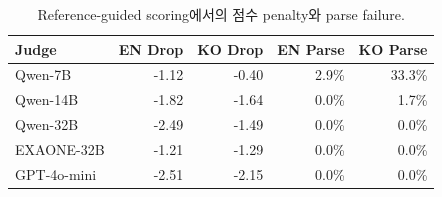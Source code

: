 \begin{table}[t]
\centering
\caption{Reference-guided scoring에서의 점수 penalty와 parse failure.}
\label{tab:reference-score-change}
\small
\begin{tabular}{lrrrr}
\toprule
Judge & EN Drop & KO Drop & EN Parse & KO Parse \\
\midrule
Qwen-7B & -1.12 & -0.40 & 2.9\% & 33.3\% \\
Qwen-14B & -1.82 & -1.64 & 0.0\% & 1.7\% \\
Qwen-32B & -2.49 & -1.49 & 0.0\% & 0.0\% \\
EXAONE-32B & -1.21 & -1.29 & 0.0\% & 0.0\% \\
GPT-4o-mini & -2.51 & -2.15 & 0.0\% & 0.0\% \\
\bottomrule
\end{tabular}
\end{table}
